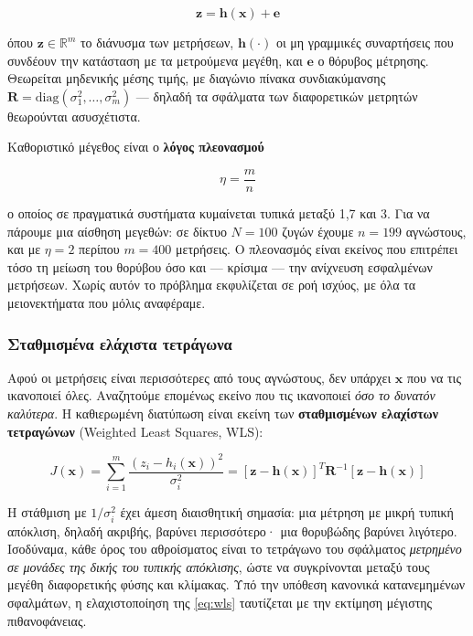 \begin{equation}
\mathbf{z} = \mathbf{h}(\mathbf{x}) + \mathbf{e}
\label{eq:measmodel}
\end{equation}

όπου $\mathbf{z} \in \mathbb{R}^{m}$ το διάνυσμα των μετρήσεων, $\mathbf{h}(\cdot)$ οι μη
γραμμικές συναρτήσεις που συνδέουν την κατάσταση με τα μετρούμενα μεγέθη, και $\mathbf{e}$
ο θόρυβος μέτρησης. Θεωρείται μηδενικής μέσης τιμής, με διαγώνιο πίνακα συνδιακύμανσης
$\mathbf{R} = \mathrm{diag}(\sigma_1^2, \ldots, \sigma_m^2)$ — δηλαδή τα σφάλματα των
διαφορετικών μετρητών θεωρούνται ασυσχέτιστα.

Καθοριστικό μέγεθος είναι ο \textbf{λόγος πλεονασμού}

\begin{equation}
\eta = \frac{m}{n}
\label{eq:redundancy}
\end{equation}

ο οποίος σε πραγματικά συστήματα κυμαίνεται τυπικά μεταξύ 1,7 και 3. Για να πάρουμε μια
αίσθηση μεγεθών: σε δίκτυο $N = 100$ ζυγών έχουμε $n = 199$ αγνώστους, και με $\eta = 2$
περίπου $m = 400$ μετρήσεις. Ο πλεονασμός είναι εκείνος που επιτρέπει τόσο τη μείωση του
θορύβου όσο και — κρίσιμα — την ανίχνευση εσφαλμένων μετρήσεων. Χωρίς αυτόν το πρόβλημα
εκφυλίζεται σε ροή ισχύος, με όλα τα μειονεκτήματα που μόλις αναφέραμε.

\subsubsection*{Σταθμισμένα ελάχιστα τετράγωνα}

Αφού οι μετρήσεις είναι περισσότερες από τους αγνώστους, δεν υπάρχει $\mathbf{x}$ που να τις
ικανοποιεί όλες. Αναζητούμε επομένως εκείνο που τις ικανοποιεί \emph{όσο το δυνατόν
καλύτερα}. Η καθιερωμένη διατύπωση είναι εκείνη των \textbf{σταθμισμένων ελαχίστων
τετραγώνων} (Weighted Least Squares, WLS):

\begin{equation}
J(\mathbf{x}) = \sum_{i=1}^{m} \frac{\left(z_i - h_i(\mathbf{x})\right)^2}{\sigma_i^2}
             = \left[\mathbf{z}-\mathbf{h}(\mathbf{x})\right]^{T} \mathbf{R}^{-1}
               \left[\mathbf{z}-\mathbf{h}(\mathbf{x})\right]
\label{eq:wls}
\end{equation}

Η στάθμιση με $1/\sigma_i^2$ έχει άμεση διαισθητική σημασία: μια μέτρηση με μικρή
τυπική απόκλιση, δηλαδή ακριβής, βαρύνει περισσότερο· μια θορυβώδης βαρύνει λιγότερο.
Ισοδύναμα, κάθε όρος του αθροίσματος είναι το τετράγωνο του σφάλματος \emph{μετρημένο σε
μονάδες της δικής του τυπικής απόκλισης}, ώστε να συγκρίνονται μεταξύ τους μεγέθη
διαφορετικής φύσης και κλίμακας. Υπό την υπόθεση κανονικά κατανεμημένων σφαλμάτων, η
ελαχιστοποίηση της \eqref{eq:wls} ταυτίζεται με την εκτίμηση μέγιστης πιθανοφάνειας.

